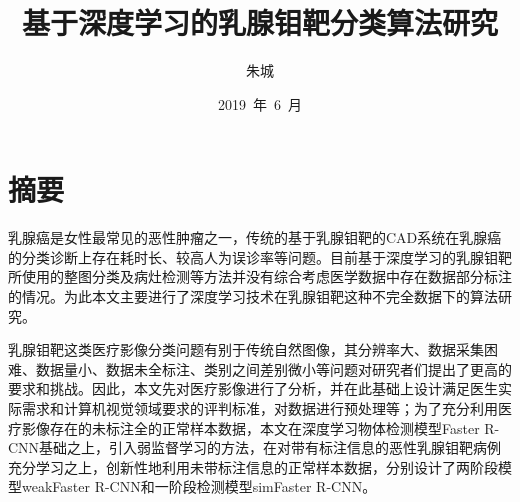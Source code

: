 \confidential{}%
\title{基于深度学习的乳腺钼靶分类算法研究}%
\author{朱城}%
\advisors{}%
\date{2019~年~6~月}%
\maketitle%
\MAKETITLE%
\intobmk\chapter*{摘\quad 要}%
\setcounter{page}{1}%

乳腺癌是女性最常见的恶性肿瘤之一，传统的基于乳腺钼靶的CAD系统在乳腺癌的分类诊断上存在耗时长、较高人为误诊率等问题。目前基于深度学习的乳腺钼靶所使用的整图分类及病灶检测等方法并没有综合考虑医学数据中存在数据部分标注的情况。为此本文主要进行了深度学习技术在乳腺钼靶这种不完全数据下的算法研究。

乳腺钼靶这类医疗影像分类问题有别于传统自然图像，其分辨率大、数据采集困难、数据量小、数据未全标注、类别之间差别微小等问题对研究者们提出了更高的要求和挑战。因此，本文先对医疗影像进行了分析，并在此基础上设计满足医生实际需求和计算机视觉领域要求的评判标准，对数据进行预处理等；为了充分利用医疗影像存在的未标注全的正常样本数据，本文在深度学习物体检测模型Faster R-CNN基础之上，引入弱监督学习的方法，在对带有标注信息的恶性乳腺钼靶病例充分学习之上，创新性地利用未带标注信息的正常样本数据，分别设计了两阶段模型weakFaster R-CNN和一阶段检测模型simFaster R-CNN。

